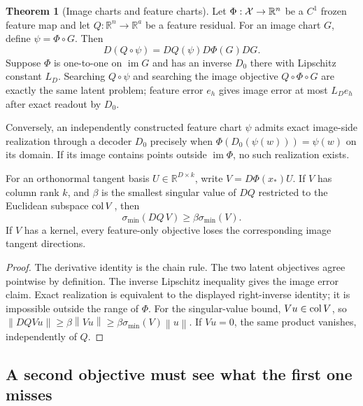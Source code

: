 \documentclass[11pt,a4paper]{article}
\theoremstyle{definition}
\newtheorem{theorem}{Theorem}[section]
\theoremstyle{definition}
\theoremstyle{remark}\newtheorem{remark}[theorem]{Remark}
\newcommand{\R}{\mathbb R}\newcommand{\Prob}{\mathbb P}\newcommand{\E}{\mathbb E}
\newcommand{\im}{\operatorname{im}}\newcommand{\dist}{\operatorname{dist}}
\newcommand{\smin}{\sigma_{\min}}\newcommand{\smax}{\sigma_{\max}}
\newcommand{\norm}[1]{\left\lVert #1\right\rVert}
\begin{document}
\begin{theorem}[Image charts and feature charts]\label{thm:feature}
Let $\Phi:\XX\to\R^n$ be a $C^1$ frozen feature map and let $Q:\R^n\to\R^a$ be a feature residual. For an image chart $G$, define $\psi=\Phi\circ G$. Then
\[
D(Q\circ\psi)=DQ(\psi)D\Phi(G)DG.
\]
Suppose $\Phi$ is one-to-one on $\im G$ and has an inverse $D_0$ there with Lipschitz constant $L_D$. Searching $Q\circ\psi$ and searching the image objective $Q\circ\Phi\circ G$ are exactly the same latent problem; feature error $e_h$ gives image error at most $L_De_h$ after exact readout by $D_0$.

Conversely, an independently constructed feature chart $\psi$ admits exact image-side realization through a decoder $D_0$ precisely when $\Phi(D_0(\psi(w)))=\psi(w)$ on its domain. If its image contains points outside $\im\Phi$, no such realization exists.

For an orthonormal tangent basis $U\in\R^{D\times k}$, write $V=D\Phi(x_*)U$. If $V$ has column rank $k$, and $\beta$ is the smallest singular value of $DQ$ restricted to the Euclidean subspace $\operatorname{col} V$, then
\[
\smin(DQ\,V)\ge\beta\smin(V).
\]
If $V$ has a kernel, every feature-only objective loses the corresponding image tangent directions.
\end{theorem}
\begin{proof}
The derivative identity is the chain rule. The two latent objectives agree pointwise by definition. The inverse Lipschitz inequality gives the image error claim. Exact realization is equivalent to the displayed right-inverse identity; it is impossible outside the range of $\Phi$. For the singular-value bound, $Vu\in\operatorname{col} V$, so $\norm{DQVu}\ge\beta\norm{Vu}\ge\beta\smin(V)\norm u$. If $Vu=0$, the same product vanishes, independently of $Q$.
\end{proof}

\subsection{A second objective must see what the first one misses}
\end{document}
